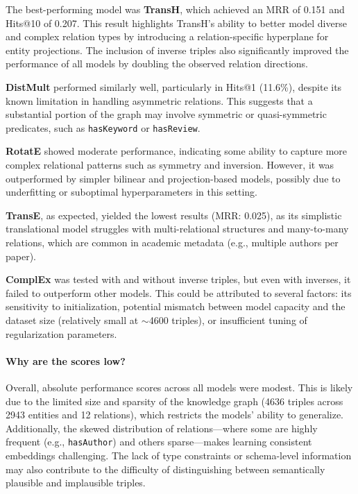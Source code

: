 \documentclass[10pt,a4paper]{article}
\begin{document}
The best-performing model was \textbf{TransH}, which achieved an MRR of 0.151 and Hits@10 of 0.207. This result highlights TransH’s ability to better model diverse and complex relation types by introducing a relation-specific hyperplane for entity projections. The inclusion of inverse triples also significantly improved the performance of all models by doubling the observed relation directions.

\textbf{DistMult} performed similarly well, particularly in Hits@1 (11.6\%), despite its known limitation in handling asymmetric relations. This suggests that a substantial portion of the graph may involve symmetric or quasi-symmetric predicates, such as \texttt{hasKeyword} or \texttt{hasReview}.

\textbf{RotatE} showed moderate performance, indicating some ability to capture more complex relational patterns such as symmetry and inversion. However, it was outperformed by simpler bilinear and projection-based models, possibly due to underfitting or suboptimal hyperparameters in this setting.

\textbf{TransE}, as expected, yielded the lowest results (MRR: 0.025), as its simplistic translational model struggles with multi-relational structures and many-to-many relations, which are common in academic metadata (e.g., multiple authors per paper).

\textbf{ComplEx} was tested with and without inverse triples, but even with inverses, it failed to outperform other models. This could be attributed to several factors: its sensitivity to initialization, potential mismatch between model capacity and the dataset size (relatively small at $\sim$4600 triples), or insufficient tuning of regularization parameters.

\paragraph{Why are the scores low?}
Overall, absolute performance scores across all models were modest. This is likely due to the limited size and sparsity of the knowledge graph (4636 triples across 2943 entities and 12 relations), which restricts the models’ ability to generalize. Additionally, the skewed distribution of relations—where some are highly frequent (e.g., \texttt{hasAuthor}) and others sparse—makes learning consistent embeddings challenging. The lack of type constraints or schema-level information may also contribute to the difficulty of distinguishing between semantically plausible and implausible triples.
\end{document}
